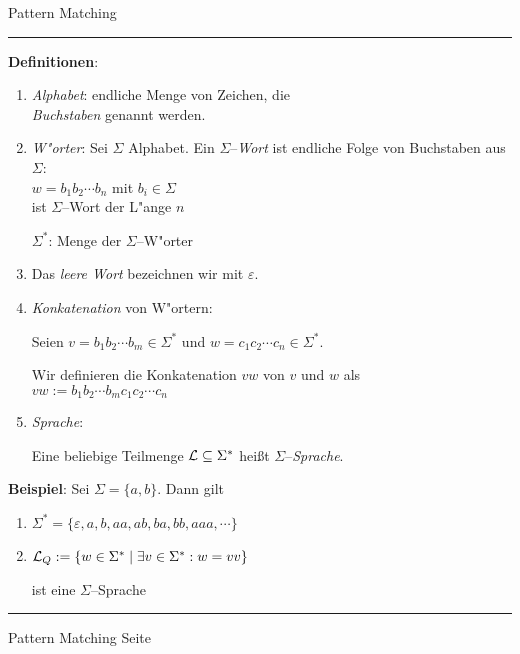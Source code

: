 \documentclass{slides}
\newcounter{mypage}
\begin{document}
\begin{center}
Pattern Matching
\end{center}


\rule{17cm}{1mm}

\footnotesize
\textbf{Definitionen}:
\begin{enumerate}
\item \emph{Alphabet}: endliche Menge von Zeichen, die \\
      \emph{Buchstaben} genannt werden.
\item \emph{W"orter}:  Sei $\Sigma$ Alphabet.  Ein $\Sigma$--\emph{Wort} ist endliche Folge von
      Buchstaben aus $\Sigma$: \\[0.3cm]
      \hspace*{1.3cm} $w = b_1b_2 \cdots b_n$ \quad mit $b_i \in \Sigma$ \\[0.3cm]
      ist $\Sigma$--Wort der L"ange $n$

      $\Sigma^*$: Menge der $\Sigma$--W"orter
\item Das \emph{leere Wort} bezeichnen wir mit $\varepsilon$.
\item \emph{Konkatenation} von W"ortern: 

      Seien $v=b_1b_2 \cdots b_m \in \Sigma^*$ und $w=c_1c_2 \cdots c_n \in \Sigma^*$.

      Wir definieren die Konkatenation $vw$ von $v$ und $w$ als \\[0.3cm]
      \hspace*{1.3cm} $vw := b_1b_2 \cdots b_mc_1c_2 \cdots c_n$
\item \emph{Sprache}:

      Eine beliebige Teilmenge ${\cal L} \subseteq \Sigma^*$ hei{\ss}t $\Sigma$--\emph{Sprache}.
\end{enumerate}
\textbf{Beispiel}: Sei $\Sigma = \{a,b\}$.  Dann gilt 
\begin{enumerate}
\item $\Sigma^* = \{ \varepsilon, a, b, aa, ab, ba, bb, aaa, \cdots \}$ 
\item ${\cal L}_{Q} := \{ w \in \Sigma^* \;|\; \exists v \in \Sigma^*: w = vv \}$ 

      ist eine $\Sigma$--Sprache
\end{enumerate}
\hspace*{1.3cm} 


\vspace*{0.2cm}

\scriptsize

\vspace*{\fill}
\tiny \addtocounter{mypage}{1}
\rule{17cm}{1mm}
Pattern Matching  \hspace*{\fill} Seite 



\end{document}

